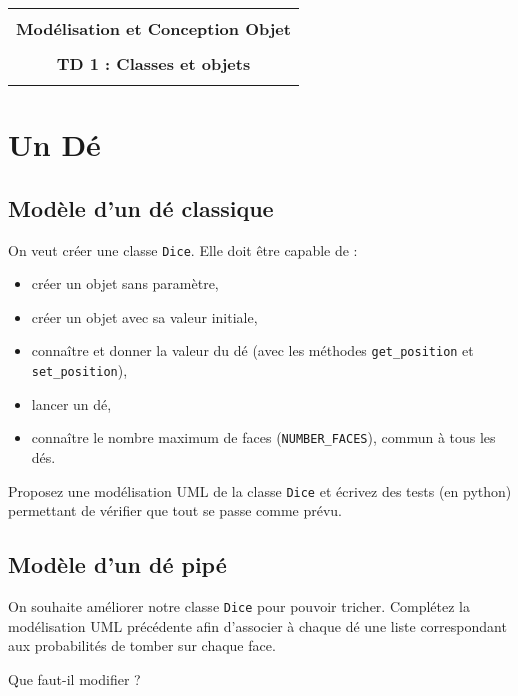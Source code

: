 \documentclass[12pt]{article}
\begin{document}
    \begin{center}
      \begin{tabular}{c}
      \hline
    \\
        {\bf \textsf {\Large Modélisation et Conception Objet}}\\
    \\
        {\bf \textsf {\Large TD 1 : Classes et objets}}\\
    \\
        \hline
      \end{tabular}
    \end{center}
    \vspace{15mm}

\section{Un Dé}

\subsection{Modèle d'un dé classique}

On veut créer une classe \verb|Dice|. Elle doit être capable de :
\begin{itemize}
	\item créer un objet sans paramètre,
	\item créer un objet avec sa valeur initiale,
	\item connaître et donner la valeur du dé (avec les méthodes \verb|get_position| et \verb|set_position|),
	\item lancer un dé,
	\item connaître le nombre maximum de faces (\verb|NUMBER_FACES|), commun à tous les dés.
\end{itemize}

Proposez une modélisation UML de la classe \verb|Dice| et écrivez des tests (en python) permettant de vérifier que tout se passe comme prévu.

\subsection{Modèle d'un dé pipé}

On souhaite améliorer notre classe \verb|Dice| pour pouvoir tricher. Complétez la modélisation UML précédente afin d'associer à chaque dé une liste correspondant aux probabilités de tomber sur chaque face.

Que faut-il modifier ?
\end{document}
